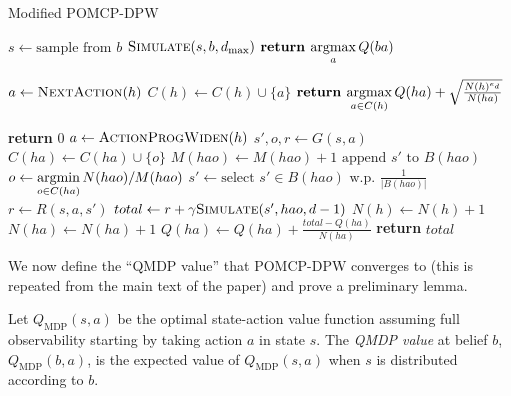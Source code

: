 \begin{algorithm}[htb]
    \caption{Modified POMCP-DPW} \label{alg:mpomcpdpw}
    \begin{algorithmic}[1]
                \State $s \gets \text{sample from }b$ \label{lin:msample}
                \State $\Call{Simulate}{s, b, d_\text{max}}$
            \EndFor
            \State $\textbf{return } \underset{a}{\argmax}\, Q(ba)$
        \EndProcedure

                \State $a \gets \Call{NextAction}{h}$
                \State $C(h) \gets C(h) \cup \{a\}$
            \EndIf
            \State $\textbf{return } \underset{a \in C(h)}{\argmax}\, Q(ha) + \sqrt{\frac{N(h)^{e_d}}{N(ha)}}$
        \EndProcedure

                \State \textbf{return} $0$
            \EndIf
            \State $a \gets \Call{ActionProgWiden}{h}$
                \State $s',o,r \gets G(s,a)$
                \State $C(ha) \gets C(ha) \cup \{o\}$
                \State $M(hao) \gets M(hao) + 1$ \label{lin:gencount}
                \State $\text{append } s' \text{ to } B(hao)$ \label{lin:minsertion}
            \Else
                \State $o \gets \underset{o \in C(ha)}{\argmin}\, N(hao)/M(hao)$
                \State $s' \gets \text{select } s' \in B(hao) \text{ w.p. } \frac{1}{|B(hao)|}$
                \State $r \gets R(s,a,s')$
            \EndIf
            \State $total \gets r + \gamma \Call{Simulate}{s', hao, d-1}$
            \State $N(h) \gets N(h)+1$
            \State $N(ha) \gets N(ha)+1$
            \State $Q(ha) \gets Q(ha) + \frac{total - Q(ha)}{N(ha)}$
            \State \textbf{return} $total$
        \EndProcedure
    \end{algorithmic}        
\end{algorithm}

We now define the ``QMDP value'' that POMCP-DPW converges to (this is repeated from the main text of the paper) and prove a preliminary lemma.

\begin{definition}
     Let $Q_\text{MDP}(s,a)$ be the optimal state-action value function assuming full observability starting by taking action $a$ in state $s$.
     The \emph{QMDP value} at belief $b$, $Q_\text{MDP}(b,a)$, is the expected value of $Q_\text{MDP}(s,a)$ when $s$ is distributed according to $b$.   
\end{definition}

